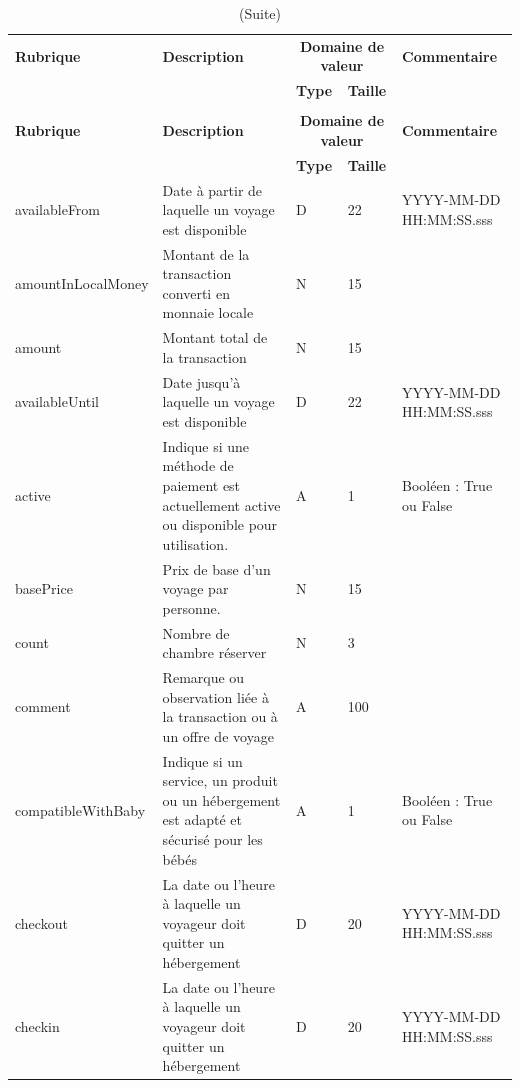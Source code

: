 \documentclass[12pt]{report}
\begin{document}
				\begin{longtable}{|p{2cm}|p{4cm}|p{2cm}|p{2cm}|p{4cm}|} 
						\caption{Dictionnaire des données} 
						\label{tab:DictDonnees}\\ 
						\hline 
						\textbf{Rubrique} & \textbf{Description} & \multicolumn{2}{|c|}{\textbf{Domaine de valeur}} & \textbf{Commentaire} \\ \cline{3-4} 
						& & \textbf{Type} & \textbf{Taille} & \\ 
						\hline 
						\endfirsthead 	
						\caption[]{(Suite)}\\ 
						\hline 
						\textbf{Rubrique} & \textbf{Description} & \multicolumn{2}{|c|}{\textbf{Domaine de valeur}} & \textbf{Commentaire} \\ \cline{3-4} 
						& & \textbf{Type} & \textbf{Taille} & \\
						\hline 
						\endhead			
						availableFrom & Date à partir de laquelle un voyage est disponible & D&22&YYYY-MM-DD HH:MM:SS.sss\\						
						\hline
						amountInLocalMoney & Montant de la transaction converti en monnaie locale & N &15&\\
						\hline
						amount & Montant total de la transaction & N & 15 &\\
						\hline
						availableUntil & Date jusqu'à laquelle un voyage est disponible & D & 22 & YYYY-MM-DD HH:MM:SS.sss\\
						\hline
						active & Indique si une méthode de paiement est actuellement active ou disponible pour utilisation.& A & 1 &  Booléen : True ou False\\
						\hline
						basePrice & Prix de base d'un voyage par personne. & N &15 &\\
						\hline
						count& Nombre de chambre réserver & N & 3&\\
						\hline
						comment & Remarque ou observation liée à la transaction ou à un offre de voyage & A & 100&\\
						\hline
						compatibleWithBaby & Indique si un service, un produit ou un hébergement est adapté et sécurisé pour les bébés & A & 1 &  Booléen : True ou False\\
						\hline
						checkout & La date ou l'heure à laquelle un voyageur doit quitter un hébergement & D &20&YYYY-MM-DD HH:MM:SS.sss\\
						\hline
						checkin & La date ou l'heure à laquelle un voyageur doit quitter un hébergement & D &20&YYYY-MM-DD HH:MM:SS.sss\\

\end{longtable}
\end{document}
